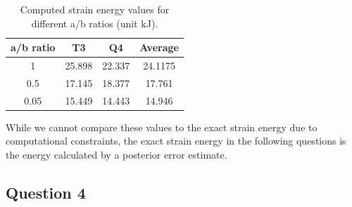 \documentclass[twoside,twocolumn,10pt]{article}
\begin{document}
\begin{table}[ht]
\centering
\caption{Computed strain energy values for different a/b ratios (unit kJ).}
\label{tab:strain_energy_values}
\begin{tabular}{cccc}
\toprule
a/b ratio & T3 & Q4 & Average \\
\midrule
1           & 25.898 & 22.337 & 24.1175 \\
0.5         & 17.145 & 18.377 & 17.761 \\
0.05        & 15.449 & 14.443 & 14.946 \\
\bottomrule
\end{tabular}
\end{table}


While we cannot compare these values to the exact strain energy due to computational constraints, the exact strain energy in the following questions is the energy calculated by a posterior error estimate.

\subsection{Question 4}
\end{document}
